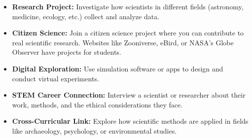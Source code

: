 \begin{itemize}
    \item \textbf{Research Project:} Investigate how scientists in different fields (astronomy, medicine, ecology, etc.) collect and analyze data.
    
    \item \textbf{Citizen Science:} Join a citizen science project where you can contribute to real scientific research. Websites like Zooniverse, eBird, or NASA's Globe Observer have projects for students.
    
    \item \textbf{Digital Exploration:} Use simulation software or apps to design and conduct virtual experiments.
    
    \item \textbf{STEM Career Connection:} Interview a scientist or researcher about their work, methods, and the ethical considerations they face.
    
    \item \textbf{Cross-Curricular Link:} Explore how scientific methods are applied in fields like archaeology, psychology, or environmental studies.
\end{itemize}